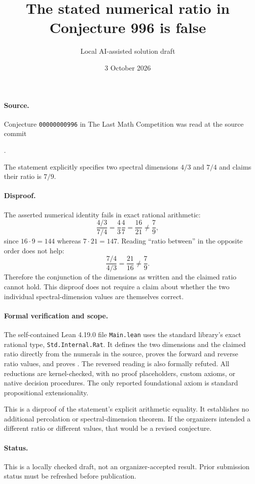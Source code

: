 \documentclass[10pt]{article}
\title{The stated numerical ratio in Conjecture 996 is false}
\author{Local AI-assisted solution draft}
\date{3 October 2026}
\makeatletter
\renewcommand{\maketitle}{\begin{center}
{\Large\bfseries\@title\par}\vspace{0.6em}
{\small\@author\par\@date}
\end{center}\vspace{0.5em}}
\makeatother
\begin{document}
\maketitle
\paragraph{Source.}
Conjecture \texttt{00000000996} in The Last Math Competition was read at
the source commit
\begin{center}\small
{}.
\end{center}
The statement explicitly specifies two
spectral dimensions $4/3$ and $7/4$ and claims their ratio is $7/9$.

\paragraph{Disproof.}
The asserted numerical identity fails in exact rational arithmetic:
\[
\frac{4/3}{7/4}=\frac{4}{3}\frac{4}{7}=\frac{16}{21}\ne\frac79,
\]
since $16\cdot9=144$ whereas $7\cdot21=147$.
Reading ``ratio between'' in the opposite order does not help:
\[
\frac{7/4}{4/3}=\frac{21}{16}\ne\frac79.
\]
Therefore the conjunction of the dimensions as written and the claimed
ratio cannot hold. This disproof does not require a claim about whether the
two individual spectral-dimension values are themselves correct.

\paragraph{Formal verification and scope.}
The self-contained Lean 4.19.0 file \texttt{Main.lean} uses the standard
library's exact rational type, \texttt{Std.Internal.Rat}. It defines the two
dimensions and the claimed ratio directly from the numerals in the source,
proves the forward and reverse ratio values, and proves
. The reversed reading is also
formally refuted. All reductions are kernel-checked, with no proof
placeholders, custom axioms, or native decision procedures. The only
reported foundational axiom is standard propositional extensionality.

This is a disproof of the statement's explicit arithmetic equality. It
establishes no additional percolation or spectral-dimension theorem. If the
organizers intended a different ratio or different values, that would be a
revised conjecture.

\paragraph{Status.}
This is a locally checked draft, not an organizer-accepted result. Prior
submission status must be refreshed before publication.
\end{document}
